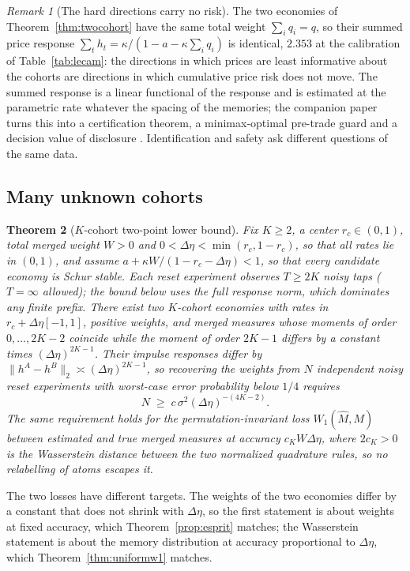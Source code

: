 \documentclass[12pt]{article}
\newtheorem{theorem}{Theorem}[section]
\theoremstyle{definition}
\theoremstyle{remark}
\newtheorem{remark}[theorem]{Remark}
\begin{document}
\begin{remark}[The hard directions carry no risk]\label{rem:riskneutral}
The two economies of Theorem~\ref{thm:twocohort} have the same total weight $\sum_iq_i=q$, so their summed price response $\sum_th_t=\kappa/(1-a-\kappa\sum_iq_i)$ is identical, $2.353$ at the calibration of Table~\ref{tab:lecam}: the directions in which prices are least informative about the cohorts are directions in which cumulative price risk does not move. The summed response is a linear functional of the response and is estimated at the parametric rate whatever the spacing of the memories; the companion paper turns this into a certification theorem, a minimax-optimal pre-trade guard and a decision value of disclosure \citep{niroula2026b}. Identification and safety ask different questions of the same data.
\end{remark}

\subsection{Many unknown cohorts}

\begin{theorem}[$K$-cohort two-point lower bound]\label{thm:kcohort}
Fix $K\ge2$, a center $r_c\in(0,1)$, total merged weight $W>0$ and $0<\Delta\eta<\min(r_c,1-r_c)$, so that all rates lie in $(0,1)$, and assume $a+\kappa W/(1-r_c-\Delta\eta)<1$, so that every candidate economy is Schur stable. Each reset experiment observes $T\ge2K$ noisy taps ($T=\infty$ allowed); the bound below uses the full response norm, which dominates any finite prefix. There exist two $K$-cohort economies with rates in $r_c+\Delta\eta[-1,1]$, positive weights, and merged measures whose moments of order $0,\ldots,2K-2$ coincide while the moment of order $2K-1$ differs by a constant times $(\Delta\eta)^{2K-1}$. Their impulse responses differ by $\|h^A-h^B\|_2\asymp(\Delta\eta)^{2K-1}$, so recovering the weights from $N$ independent noisy reset experiments with worst-case error probability below $1/4$ requires
\[
N\;\ge\;c\,\sigma^2(\Delta\eta)^{-(4K-2)} .
\]
The same requirement holds for the permutation-invariant loss $W_1(\hat M,M)$ between estimated and true merged measures at accuracy $c_KW\Delta\eta$, where $2c_K>0$ is the Wasserstein distance between the two normalized quadrature rules, so no relabelling of atoms escapes it.
\end{theorem}

The two losses have different targets. The weights of the two economies differ by a constant that does not shrink with $\Delta\eta$, so the first statement is about weights at fixed accuracy, which Theorem~\ref{prop:esprit} matches; the Wasserstein statement is about the memory distribution at accuracy proportional to $\Delta\eta$, which Theorem~\ref{thm:uniformw1} matches.
\end{document}
